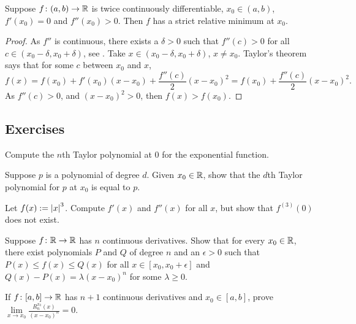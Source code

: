 \begin{prop}
Suppose $f \colon (a,b) \to {\mathbb{R}}$ is twice continuously differentiable,
$x_0 \in (a,b)$, $f'(x_0) = 0$ and $f''(x_0) > 0$.  Then $f$ has a strict relative
minimum at $x_0$.
\end{prop}

\begin{proof}
As $f''$ is continuous, there exists a $\delta > 0$
such that $f''(c) > 0$ for all $c \in (x_0-\delta,x_0+\delta)$,
see .
Take $x \in (x_0-\delta,x_0+\delta)$, $x \not= x_0$.
Taylor's theorem says that for some $c$ between $x_0$ and $x$,
\begin{equation*}
f(x) 
=
f(x_0) + f'(x_0) (x-x_0) +
\frac{f''(c)}{2}{(x-x_0)}^{2} 
=
f(x_0) + \frac{f''(c)}{2}{(x-x_0)}^{2}  .
\end{equation*}
As $f''(c) > 0$, and ${(x-x_0)}^2 > 0$, then $f(x) > f(x_0)$.
\end{proof}

\subsection{Exercises}

\begin{exercise}
Compute the $n$th Taylor polynomial at $0$ for the exponential function.
\end{exercise}

\begin{exercise}
Suppose $p$ is a polynomial of degree $d$.  Given $x_0 \in {\mathbb{R}}$,
show that
the $d$th Taylor polynomial for $p$ at $x_0$ is equal to $p$.
\end{exercise}

\begin{exercise}
Let $f(x) := \left\lvert {x} \right\rvert^3$.  Compute $f'(x)$ and $f''(x)$ for all $x$,
but show that $f^{(3)}(0)$ does not exist.
\end{exercise}

\begin{exercise}
Suppose $f \colon {\mathbb{R}} \to {\mathbb{R}}$ has $n$ continuous derivatives.  Show
that for every $x_0 \in {\mathbb{R}}$,
there exist polynomials $P$ and $Q$ of degree $n$ and 
an $\epsilon > 0$ such that $P(x) \leq f(x) \leq Q(x)$ for all $x \in
[x_0,x_0+\epsilon]$  and
$Q(x)-P(x) = \lambda {(x-x_0)}^n$ for some $\lambda \geq 0$.
\end{exercise}

\begin{exercise}
If $f \colon [a,b] \to {\mathbb{R}}$ has $n+1$ continuous derivatives
and $x_0 \in [a,b]$,
prove
$\lim\limits_{x\to x_0} \frac{R_n^{x_0}(x)}{{(x-x_0)}^n} = 0$.
\end{exercise}

